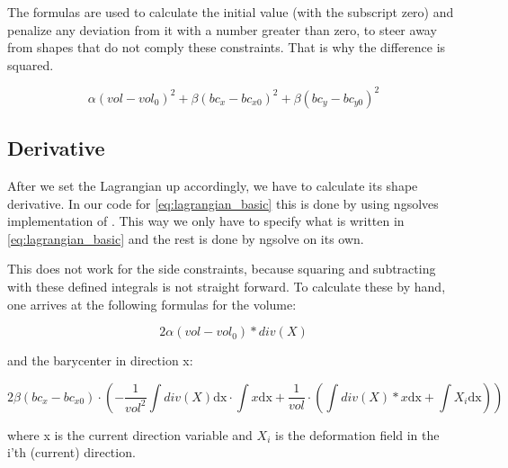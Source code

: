 The formulas are used to calculate the initial value (with the subscript zero) and penalize any deviation from it with a number greater than zero, to steer away from shapes that do not comply these constraints. That is why the difference is squared.

\begin{equation}\label{eq:lagrangian_constraints}
	\alpha (vol-vol_0)^2 + \beta (bc_x-bc_{x0})^2 + \beta (bc_y-bc_{y0})^2
\end{equation}

\subsection{Derivative}
After we set the Lagrangian up accordingly, we have to calculate its shape derivative.
In our code for \ref{eq:lagrangian_basic} this is done by using ngsolves implementation of . This way we only have to specify what is written in \ref{eq:lagrangian_basic} and the rest is done by ngsolve on its own.

This does not work for the side constraints, because squaring and subtracting with these defined integrals is not straight forward.
To calculate these by hand, one arrives at the following formulas for the volume:

\begin{equation}\label{eq:constraints_vol}
	2\alpha (vol-vol_0)*div(X)
\end{equation}

and the barycenter in direction x:

\begin{equation}\label{eq:constraints_bc}
	2\beta (bc_x-bc_{x0})\cdot\left(-\frac{1}{vol^2}\int div(X)\mathrm{dx} \cdot \int x \mathrm{dx} + \frac{1}{vol} \cdot (\int div(X)*x \mathrm{dx} + \int X_i\mathrm{dx})\right)
\end{equation}

where x is the current direction variable and $X_i$ is the deformation field in the i'th (current) direction.


